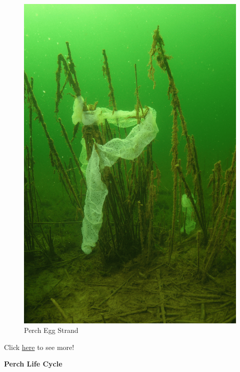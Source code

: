 \documentclass[
]{book}
\begin{document}
\begin{figure}
\centering
\includegraphics{images/Lab8_Egg_strand_perch.png}
\caption{Perch Egg Strand}
\end{figure}

Click \href{https://www.youtube.com/watch?v=T7xXfhOjtsU}{here} to see more!

\textbf{Perch Life Cycle}
\end{document}
